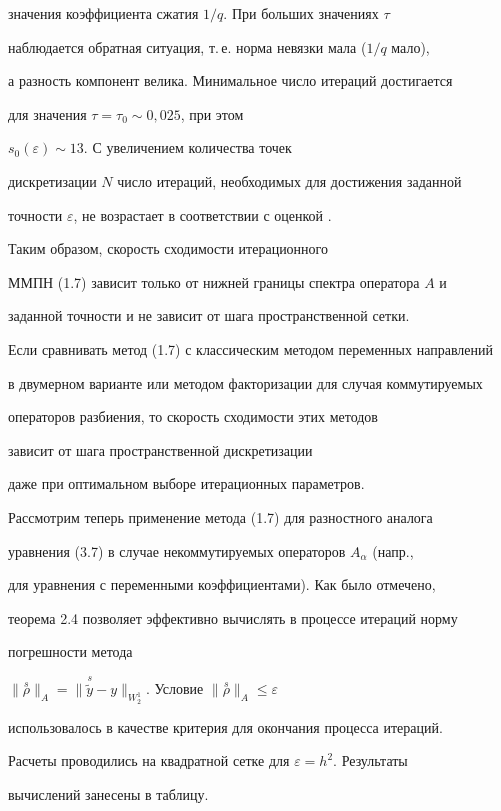 значения коэффициента сжатия $1/q$. При больших значениях $\tau$


наблюдается обратная ситуация, т.\,е. норма невязки мала ($1/q$ мало),


а разность компонент велика. Минимальное число итераций достигается


для значения $\tau=\tau_0\sim 0{,}025$, при этом 


$s_0(\varepsilon)\sim 13$. С увеличением количества точек


дискретизации $N$ число итераций, необходимых для достижения заданной


точности $\varepsilon$, не возрастает в соответствии с оценкой .


Таким образом, скорость сходимости итерационного


ММПН (1.7) зависит только от нижней границы спектра оператора $A$ и 


заданной точности и не зависит от шага пространственной сетки.


Если сравнивать метод (1.7) с классическим методом переменных направлений


в двумерном варианте или методом факторизации для случая коммутируемых


операторов разбиения, то скорость сходимости этих методов


зависит от шага пространственной дискретизации


даже при оптимальном выборе итерационных параметров.





Рассмотрим теперь применение метода (1.7) для разностного аналога


уравнения (3.7) в случае некоммутируемых операторов $A_\alpha$ (напр.,


для уравнения с переменными коэффициентами). Как было отмечено,


теорема 2.4 позволяет эффективно вычислять в процессе итераций норму


погрешности метода


$\|{\overset{s}{\rho}}\|_A=\|{\overset{s}{\widetilde y}}


-y\|_{W_2^1}$. Условие $\|{\overset{s}{\rho}}\|_A\leq \varepsilon$


использовалось в качестве критерия для окончания процесса итераций.


Расчеты проводились на квадратной сетке для $\varepsilon=h^2$. Результаты


вычислений занесены в таблицу.


